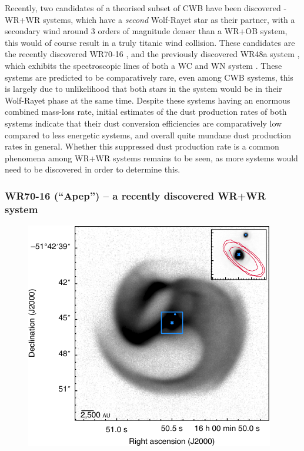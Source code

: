 Recently, two candidates of a theorised subset of CWB have been discovered - WR+WR systems, which have a \textit{second} Wolf-Rayet star as their partner, with a secondary wind around 3 orders of magnitude denser than a WR+OB system, this would of course result in a truly titanic wind collision.
These candidates are the recently discovered WR70-16 \parencite{callinghamAnisotropicWindsWolf2019}, and the previously discovered WR48a system \parencite{danksInfraredSpectroscopyInfrared1983}, which exhibits the spectroscopic lines of both a WC and WN system \parencite{williamsVariableDustEmission2019}.
These systems are predicted to be comparatively rare, even among CWB systems, this is largely due to unlikelihood that both stars in the system would be in their Wolf-Rayet phase at the same time.
Despite these systems having an enormous combined mass-loss rate, initial estimates of the dust production rates of both systems indicate that their dust conversion efficiencies are comparatively low compared to less energetic systems, and overall quite mundane dust production rates in general.
Whether this suppressed dust production rate is a common phenomena among WR+WR systems remains to be seen, as more systems would need to be discovered in order to determine this.

\subsubsection{WR70-16 (``Apep'') -- a recently discovered WR+WR system}

\begin{figure}[h]
  \centering
  \includegraphics[]{assets/systems/apep-callingham-2019.pdf}
  \caption[\textit{VLT image of Apep \parencite{callinghamAnisotropicWindsWolf2019}}]{\textcite{callinghamAnisotropicWindsWolf2019}}
  \label{fig:apep-callingham}
\end{figure}

